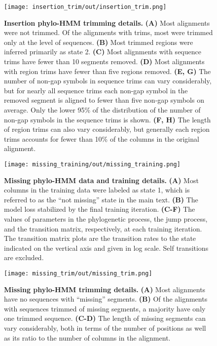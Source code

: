 \begin{figure}[h!]
\texttt{[image: insertion\_trim/out/insertion\_trim.png]}
\centering
\caption{\textbf{Insertion phylo-HMM trimming details.}
\textbf{(A)} Most alignments were not trimmed. Of the alignments with trims, most were trimmed only at the level of sequences. \textbf{(B)} Most trimmed regions were inferred primarily as state 2. \textbf{(C)} Most alignments with sequence trims have fewer than 10 segments removed. \textbf{(D)} Most alignments with region trims have fewer than five regions removed. \textbf{(E, G)} The number of non-gap symbols in sequence trims can vary considerably, but for nearly all sequence trims each non-gap symbol in the removed segment is aligned to fewer than five non-gap symbols on average. Only the lower 95\% of the distribution of the number of non-gap symbols in the sequence trims is shown. \textbf{(F, H)} The length of region trims can also vary considerably, but generally each region trims accounts for fewer than 10\% of the columns in the original alignment.}
\label{sfig:insertion_trim}
\end{figure}

\begin{figure}[h!]
\texttt{[image: missing\_training/out/missing\_training.png]}
\centering
\caption{\textbf{Missing phylo-HMM data and training details.}
\textbf{(A)} Most columns in the training data were labeled as state 1, which is referred to as the ``not missing'' state in the main text. \textbf{(B)} The model loss stabilized by the final training iteration. \textbf{(C-F)} The values of parameters in the phylogenetic process, the jump process, and the transition matrix, respectively, at each training iteration. The transition matrix plots are the transition rates to the state indicated on the vertical axis and given in log scale. Self transitions are excluded.}
\label{sfig:missing_training}
\end{figure}

\begin{figure}[h!]
\texttt{[image: missing\_trim/out/missing\_trim.png]}
\centering
\caption{\textbf{Missing phylo-HMM trimming details.}
\textbf{(A)} Most alignments have no sequences with ``missing'' segments. \textbf{(B)} Of the alignments with sequences trimmed of missing segments, a majority have only one trimmed sequence. \textbf{(C-D)} The length of missing segments can vary considerably, both in terms of the number of positions as well as its ratio to the number of columns in the alignment.}
\label{sfig:missing_trim}
\end{figure}

